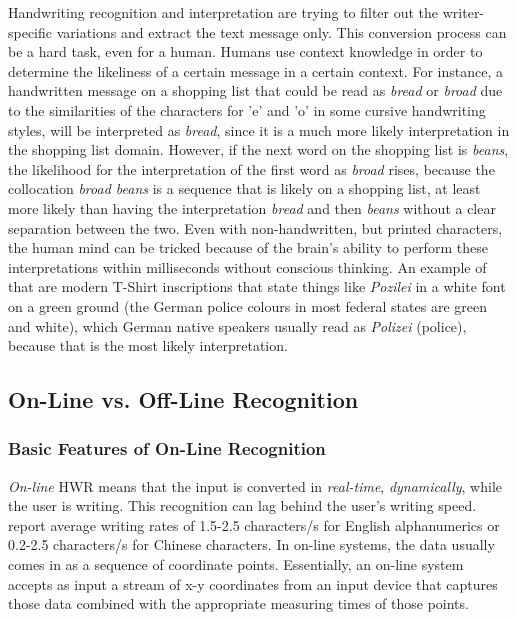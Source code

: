 Handwriting recognition and interpretation are trying to filter out the 
writer-specific variations and extract the text message only. This conversion
process can be a hard task, even for a human. Humans use context knowledge
in order to determine the likeliness of a certain message in a certain context.
For instance, a handwritten message on a shopping list that could be read
as \emph{bread} or \emph{broad} due to the similarities of the characters 
for 'e' and 'o' in some cursive handwriting styles, will be interpreted 
as \emph{bread}, since it is a much more likely interpretation in the 
shopping list domain. However, if the next word on the shopping list 
is \emph{beans}, the likelihood for the interpretation of the first word
as \emph{broad} rises, because the collocation \emph{broad beans} is a
sequence that is likely on a shopping list, at least more likely than
having the interpretation \emph{bread} and then \emph{beans} without a
clear separation between the two. Even with non-handwritten, 
but printed characters, the human mind can be tricked because of the 
brain's ability to perform these interpretations within milliseconds 
without conscious thinking. An example of that are modern T-Shirt inscriptions
that state things like \emph{Pozilei} in a white font on a green ground 
(the German police colours in most federal states are green and white), 
which German native speakers usually read as \emph{Polizei} (police),
because that is the most likely interpretation.

\subsection{On-Line vs. Off-Line Recognition}
\label{sec:onlinevsoffline}


\subsubsection{Basic Features of On-Line Recognition}
\label{sec:basicfeaturesofonlinerecognition}

\emph{On-line} HWR means that the input is converted in \emph{real-time}, 
\emph{dynamically}, while the user is writing. This recognition can lag behind
the user's writing speed.  report average writing rates 
of 1.5-2.5 characters/s for English alphanumerics or 0.2-2.5 characters/s for 
Chinese characters. In on-line systems, the data usually comes in as a sequence 
of coordinate points. Essentially, an on-line system accepts as input a
stream of x-y coordinates from an input device that captures those data
combined with the appropriate measuring times of those points.

